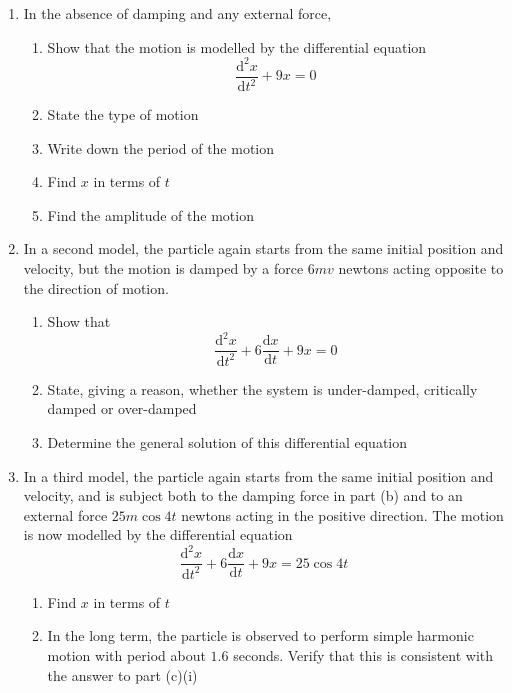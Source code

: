 \documentclass[leqno]{article}
\begin{document}
\begin{enumerate}[
  label=\textbf{\arabic*.},
  leftmargin=*,
  topsep=0pt,
  partopsep=0pt,
  parsep=0pt
]
\begin{enumerate}[label=\textbf{(\alph*)}]
  \item In the absence of damping and any external force,
  \begin{enumerate}[label=(\roman*)]
    \item Show that the motion is modelled by the differential equation
    \[
    \frac{\mathrm{d}^2 x}{\mathrm{d} t^2}+9x=0
    \] 
    \item State the type of motion 
    \item Write down the period of the motion 
    \item Find $x$ in terms of $t$ 
    \item Find the amplitude of the motion  \\
  \end{enumerate}
  \item In a second model, the particle again starts from the same initial position and velocity, but the motion is damped by a force $6mv$ newtons acting opposite to the direction of motion. \\
  \begin{enumerate}[label=(\roman*)]
    \item Show that
    \[
    \frac{\mathrm{d}^2 x}{\mathrm{d} t^2}+6\frac{\mathrm{d} x}{\mathrm{d} t}+9x=0
    \] 
    \item State, giving a reason, whether the system is under-damped, critically damped or over-damped 
    \item Determine the general solution of this differential equation  \\
  \end{enumerate}
  \item In a third model, the particle again starts from the same initial position and velocity, and is subject both to the damping force in part (b) and to an external force $25m\cos 4t$ newtons acting in the positive direction. The motion is now modelled by the differential equation
  \[
  \frac{\mathrm{d}^2 x}{\mathrm{d} t^2}+6\frac{\mathrm{d} x}{\mathrm{d} t}+9x=25\cos 4t
  \]
  \begin{enumerate}[label=(\roman*)]
    \item Find $x$ in terms of $t$  \\
    \item In the long term, the particle is observed to perform simple harmonic motion with period about $1.6$ seconds. Verify that this is consistent with the answer to part (c)(i)  \\
  \end{enumerate}
\end{enumerate}


\end{enumerate}
\end{document}
